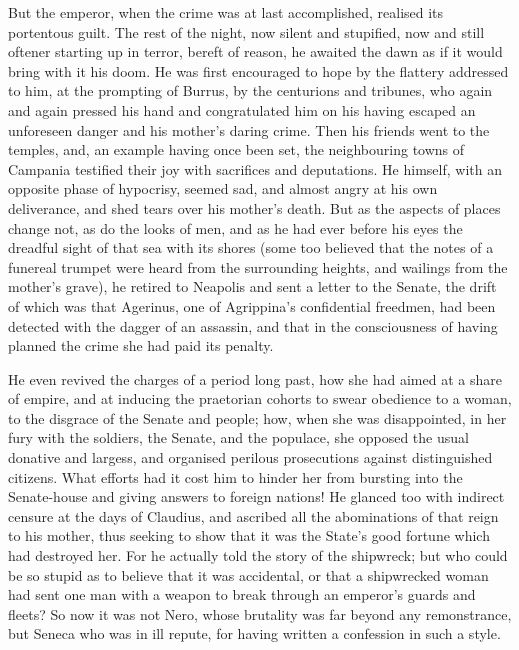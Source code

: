 
But the emperor, when the crime was at last accomplished, realised its portentous guilt. The rest of the night, now silent and stupified, now and still oftener starting up in terror, bereft of reason, he awaited the dawn as if it would bring with it his doom. He was first encouraged to hope by the flattery addressed to him, at the prompting of Burrus, by the centurions and tribunes, who again and again pressed his hand and congratulated him on his having escaped an unforeseen danger and his mother's daring crime. Then his friends went to the temples, and, an example having once been set, the neighbouring towns of Campania testified their joy with sacrifices and deputations. He himself, with an opposite phase of hypocrisy, seemed sad, and almost angry at his own deliverance, and shed tears over his mother's death. But as the aspects of places change not, as do the looks of men, and as he had ever before his eyes the dreadful sight of that sea with its shores (some too believed that the notes of a funereal trumpet were heard from the surrounding heights, and wailings from the mother's grave), he retired to Neapolis and sent a letter to the Senate, the drift of which was that Agerinus, one of Agrippina's confidential freedmen, had been detected with the dagger of an assassin, and that in the consciousness of having planned the crime she had paid its penalty.


He even revived the charges of a period long past, how she had aimed at a share of empire, and at inducing the praetorian cohorts to swear obedience to a woman, to the disgrace of the Senate and people; how, when she was disappointed, in her fury with the soldiers, the Senate, and the populace, she opposed the usual donative and largess, and organised perilous prosecutions against distinguished citizens. What efforts had it cost him to hinder her from bursting into the Senate-house and giving answers to foreign nations! He glanced too with indirect censure at the days of Claudius, and ascribed all the abominations of that reign to his mother, thus seeking to show that it was the State's good fortune which had destroyed her. For he actually told the story of the shipwreck; but who could be so stupid as to believe that it was accidental, or that a shipwrecked woman had sent one man with a weapon to break through an emperor's guards and fleets? So now it was not Nero, whose brutality was far beyond any remonstrance, but Seneca who was in ill repute, for having written a confession in such a style.

